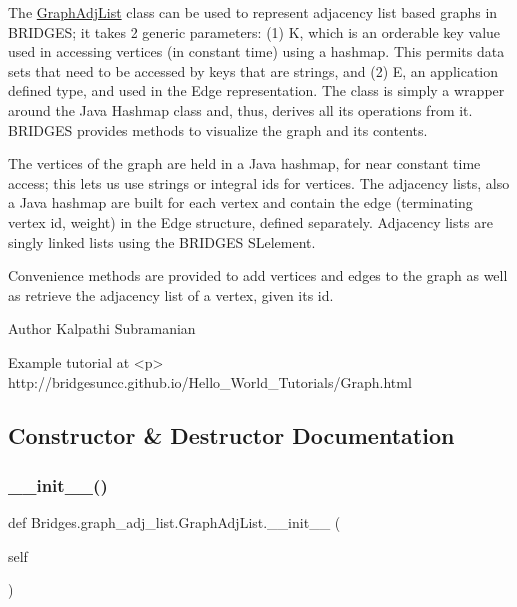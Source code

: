 The \mbox{\hyperlink{class_bridges_1_1graph__adj__list_1_1_graph_adj_list}{Graph\+Adj\+List}} class can be used to represent adjacency list based graphs in B\+R\+I\+D\+G\+ES; it takes 2 generic parameters\+: (1) K, which is an orderable key value used in accessing vertices (in constant time) using a hashmap. This permits data sets that need to be accessed by keys that are strings, and (2) E, an application defined type, and used in the Edge representation. The class is simply a wrapper around the Java Hashmap class and, thus, derives all its operations from it. B\+R\+I\+D\+G\+ES provides methods to visualize the graph and its contents.

The vertices of the graph are held in a Java hashmap, for near constant time access; this lets us use strings or integral ids for vertices. The adjacency lists, also a Java hashmap are built for each vertex and contain the edge (terminating vertex id, weight) in the Edge structure, defined separately. Adjacency lists are singly linked lists using the B\+R\+I\+D\+G\+ES S\+Lelement.

Convenience methods are provided to add vertices and edges to the graph as well as retrieve the adjacency list of a vertex, given its id.

\begin{DoxyAuthor}{Author}
Kalpathi Subramanian
\end{DoxyAuthor}
\begin{DoxyVerb}\sa Example tutorial at <p>
    http://bridgesuncc.github.io/Hello_World_Tutorials/Graph.html\end{DoxyVerb}
 

\subsection{Constructor \& Destructor Documentation}
\mbox{\label{class_bridges_1_1graph__adj__list_1_1_graph_adj_list_a38885cb113043d73371b5799271a0150}} 
\subsubsection{\texorpdfstring{\+\_\+\+\_\+init\+\_\+\+\_\+()}{\_\_init\_\_()}}
{\footnotesize\ttfamily def Bridges.\+graph\+\_\+adj\+\_\+list.\+Graph\+Adj\+List.\+\_\+\+\_\+init\+\_\+\+\_\+ (\begin{DoxyParamCaption}\item[{}]{self }\end{DoxyParamCaption})}



